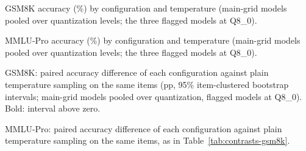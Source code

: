 \documentclass[10pt]{article}
\begin{document}
\begin{table}[p]\centering
\caption{GSM8K accuracy (\%) by configuration and temperature (main-grid models pooled over
quantization levels; the three flagged models at Q8\_0).}
\label{tab:grid-gsm8k}
\footnotesize\setlength{\tabcolsep}{4pt}
\end{table}
\begin{table}[p]\centering
\caption{MMLU-Pro accuracy (\%) by configuration and temperature (main-grid models pooled over
quantization levels; the three flagged models at Q8\_0).}
\label{tab:grid-mmlu}
\footnotesize\setlength{\tabcolsep}{4pt}
\end{table}
\begin{table}[p]\centering
\caption{GSM8K: paired accuracy difference of each configuration against plain temperature
sampling on the same items (pp, 95\% item-clustered bootstrap intervals; main-grid models
pooled over quantization, flagged models at Q8\_0). Bold: interval above zero.}
\label{tab:contrasts-gsm8k}
\scriptsize\setlength{\tabcolsep}{3pt}
\end{table}
\begin{table}[p]\centering
\caption{MMLU-Pro: paired accuracy difference of each configuration against plain temperature
sampling on the same items, as in Table~\ref{tab:contrasts-gsm8k}.}
\label{tab:contrasts-mmlu}
\scriptsize\setlength{\tabcolsep}{3pt}
\end{table}
\end{document}
